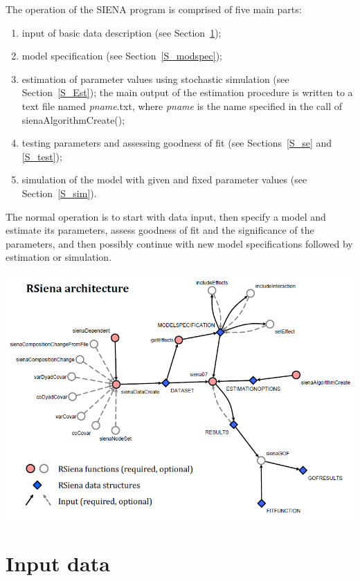\documentclass[a4paper,fleqn,11pt]{article}
\newcommand{\+}{\, + \,}
\newcommand{\SI}{{\sf SIENA }}
\begin{document}
The operation of the \SI program is comprised of five main parts:
\begin{enumerate}
 \item input of basic data description (see Section~\ref{S_InputData});
 \item model specification (see Section~\ref{S_modspec});
 \item estimation of parameter values using stochastic simulation
        (see Section~\ref{S_Est});
    the main output of the estimation procedure
    is written to a text file named
    \textsf{\textsl{pname}.txt}, where \textsf{\textsl{pname}} is the name
    specified in the call of \textsf{sienaAlgorithmCreate()};
 \item testing parameters and assessing goodness of fit
        (see Sections~\ref{S_se} and \ref{S_test});
 \item simulation of the model with given and fixed parameter values
        (see Section~\ref{S_sim}).
\end{enumerate}

The normal operation is to start with data input, then specify a
model and estimate its parameters,
assess goodness of fit and the significance of the parameters,
and then possibly continue with new
model specifications followed by estimation or simulation.


\vfill
\begin{center}
\includegraphics*[scale=0.7]{RSienaArchitecture.png}
\end{center}
\vfill




\newpage

\section{Input data}
\label{S_InputData}
\end{document}
